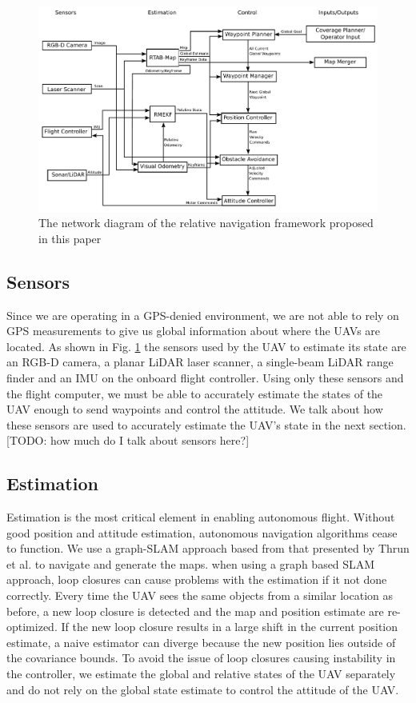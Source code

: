 \documentclass[letterpaper, 10 pt, conference]{ieeeconf}  %
\newcommand{\todo}[1]{{\color{blue}[TODO: #1]}}
\begin{document}
\begin{figure}
\centering
\includegraphics[width=1.0\linewidth]{rtab_relative_nav_network}
\caption{The network diagram of the relative navigation framework proposed in this paper}
\label{fig:rtab_network}
\end{figure}

\subsection{Sensors}

Since we are operating in a GPS-denied environment, we are not able to rely on GPS measurements to give us global information about where the UAVs are located. As shown in Fig. \ref{fig:rtab_network} the sensors used by the UAV to estimate its state are an RGB-D camera, a planar LiDAR laser scanner, a single-beam LiDAR range finder and an IMU on the onboard flight controller. Using only these sensors and the flight computer, we must be able to accurately estimate the states of the UAV enough to send waypoints and control the attitude. We talk about how these sensors are used to accurately estimate the UAV's state in the next section. \todo{how much do I talk about sensors here?}

\subsection{Estimation}

Estimation is the most critical element in enabling autonomous flight. Without good position and attitude estimation, autonomous navigation algorithms cease to function. We use a graph-SLAM approach based from that presented by Thrun et al. \cite{Thrun2006} to navigate and generate the maps. when using a graph based SLAM approach, loop closures can cause problems with the estimation if it not done correctly. Every time the UAV sees the same objects from a similar location as before, a new loop closure is detected and the map and position estimate are re-optimized. If the new loop closure results in a large shift in the current position estimate, a naive estimator can diverge because the new position lies outside of the covariance bounds. To avoid the issue of loop closures causing instability in the controller, we estimate the global and relative states of the UAV separately and do not rely on the global state estimate to control the attitude of the UAV.
\end{document}
